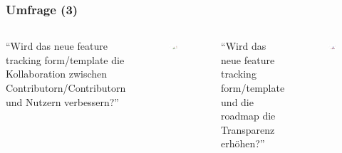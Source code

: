 \documentclass{beamer}
\begin{document}
\begin{frame}
\frametitle{Umfrage (3)}
\begin{columns}
  ``Wird das neue feature tracking form/template die Kollaboration zwischen Contributorn/Contributorn und Nutzern verbessern?''
   \begin{figure}[h!]
    \centering
    \includegraphics[scale=0.25,keepaspectratio=true]{./amarok3bchalo3bc.png}
   \end{figure}
 ``Wird das neue feature tracking form/template und die roadmap die Transparenz erh\"ohen?''\newline
   \begin{figure}[h!]
    \centering
    \includegraphics[scale=0.25,keepaspectratio=true]{./amarok3dhalo3d.png}
   \end{figure}
\end{columns}
\end{frame}
\end{document}
